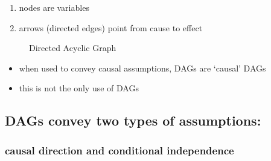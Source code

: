 \documentclass[
  letterpaper,
  DIV=11,
  numbers=noendperiod]{scrartcl}
\providecommand{\tightlist}{%
  \setlength{\itemsep}{0pt}\setlength{\parskip}{0pt}}\usepackage{longtable,booktabs,array}
\begin{document}
\begin{enumerate}
\def\labelenumi{\arabic{enumi}.}
\tightlist
\item
  nodes are variables
\item
  arrows (directed edges) point from cause to effect
\end{enumerate}

\begin{figure}


\caption{\label{fig-dag-fire0}Directed Acyclic Graph}

\end{figure}%

\begin{itemize}
\tightlist
\item
  when used to convey causal assumptions, DAGs are `causal' DAGs
\item
  this is not the only use of DAGs
\end{itemize}

\subsection{DAGs convey two types of
assumptions:}\label{dags-convey-two-types-of-assumptions}

\subsubsection{causal direction and conditional
independence}\label{causal-direction-and-conditional-independence}
\end{document}
